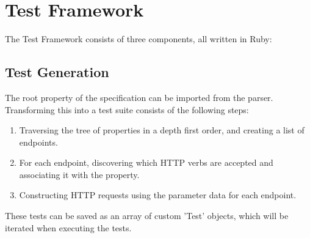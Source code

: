 \chapter{Test Framework}

The Test Framework consists of three components, all written in Ruby:

\section{Test Generation}

The root property of the specification can be imported from the parser. Transforming this into a test suite consists of the following steps:

\begin{enumerate}
\item Traversing the tree of properties in a depth first order, and creating a list of endpoints.
\item For each endpoint, discovering which HTTP verbs are accepted and associating it with the property.
\item Constructing HTTP requests using the parameter data for each endpoint.
\end{enumerate}

These tests can be saved as an array of custom 'Test' objects, which will be iterated when executing the tests.

